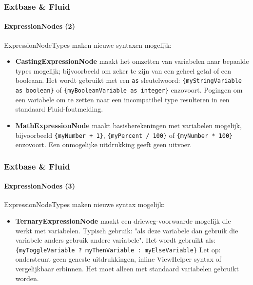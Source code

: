 \begin{frame}[fragile]
	\frametitle{Extbase \& Fluid}
	\framesubtitle{ExpressionNodes (2)}

	ExpressionNodeTypes maken nieuwe syntaxen mogelijk:

	\begin{itemize}

		\item \textbf{CastingExpressionNode}\newline
			\small
				maakt het omzetten van variabelen naar bepaalde types mogelijk; bijvoorbeeld
				om zeker te zijn van een geheel getal of een booleaan. Het wordt gebruikt met een
				\texttt{as} sleutelwoord:
				\texttt{\{myStringVariable as boolean\}} of
				\texttt{\{myBooleanVariable as integer\}} enzovoort.
				Pogingen om een variabele om te zetten naar een incompatibel type resulteren in een
				standaard Fluid-foutmelding.
			\normalsize

		\item \textbf{MathExpressionNode}\newline
			\small
				maakt basisberekeningen met variabelen mogelijk, bijvoorbeeld
				\texttt{\{myNumber + 1\}}, \texttt{\{myPercent / 100\}} of
				\texttt{\{myNumber * 100\}} enzovoort.
				Een onmogelijke uitdrukking geeft geen uitvoer.
			\normalsize

	\end{itemize}

\end{frame}


\begin{frame}[fragile]
	\frametitle{Extbase \& Fluid}
	\framesubtitle{ExpressionNodes (3)}

	ExpressionNodeTypes maken nieuwe syntax mogelijk:

	\begin{itemize}

		\item \textbf{TernaryExpressionNode}\newline
			\small
				maakt een drieweg-voorwaarde mogelijk die werkt met variabelen.
				Typisch gebruik: "als deze variabele dan gebruik die variabele anders gebruik
				andere variabele". Het wordt gebruikt als:\newline
				\texttt{\{myToggleVariable ? myThenVariable : myElseVariable\}}\newline
				Let op: ondersteunt geen geneste uitdrukkingen, inline ViewHelper
				syntax of vergelijkbaar erbinnen. Het moet alleen met standaard variabelen
				gebruikt worden.
			\normalsize

	\end{itemize}

\end{frame}

